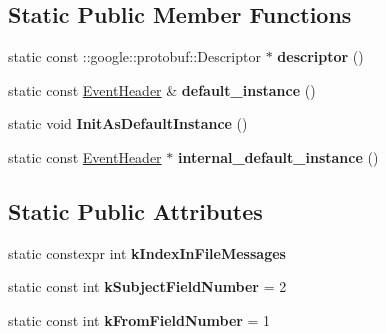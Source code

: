 \subsection*{Static Public Member Functions}
\begin{DoxyCompactItemize}
\item 
\mbox{\label{classtbMessages_1_1EventHeader_a51c722355d1fca67b1024733dca9f09f}} 
static const \+::google\+::protobuf\+::\+Descriptor $\ast$ {\bfseries descriptor} ()
\item 
\mbox{\label{classtbMessages_1_1EventHeader_a982ba383994bad24976a728c7ad05d7d}} 
static const \hyperlink{classtbMessages_1_1EventHeader}{Event\+Header} \& {\bfseries default\+\_\+instance} ()
\item 
\mbox{\label{classtbMessages_1_1EventHeader_a6c8a08cf9a5435ae931f3153175a6313}} 
static void {\bfseries Init\+As\+Default\+Instance} ()
\item 
\mbox{\label{classtbMessages_1_1EventHeader_a8fbebeceada7a125db4e32699c24e502}} 
static const \hyperlink{classtbMessages_1_1EventHeader}{Event\+Header} $\ast$ {\bfseries internal\+\_\+default\+\_\+instance} ()
\end{DoxyCompactItemize}
\subsection*{Static Public Attributes}
\begin{DoxyCompactItemize}
\item 
static constexpr int {\bfseries k\+Index\+In\+File\+Messages}
\item 
\mbox{\label{classtbMessages_1_1EventHeader_a457b78f3b7ed3d1bb9996c673bd8c000}} 
static const int {\bfseries k\+Subject\+Field\+Number} = 2
\item 
\mbox{\label{classtbMessages_1_1EventHeader_aaaff3c6ee88e9f74bc13cecce1e63f26}} 
static const int {\bfseries k\+From\+Field\+Number} = 1
\end{DoxyCompactItemize}
